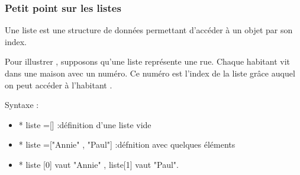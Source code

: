 \begin{frame}
  \frametitle{Petit point sur les listes}
  Une liste est une structure de données permettant d'accéder
à un objet par son index.


Pour illustrer , supposons qu'une liste représente une rue.
Chaque habitant vit dans une maison avec un numéro.
Ce numéro est l'index de la liste grâce auquel on peut accéder
à l'habitant .


Syntaxe :
\begin{itemize}
\item* liste =[] :définition d'une liste vide
\item* liste =["Annie" , "Paul"] :défnition avec quelques éléments
\item* liste [0] vaut "Annie" , liste[1] vaut "Paul".
\end{itemize}



\end{frame}
\begin{frame}
  
\end{frame}
\begin{frame}
  
\end{frame}\begin{frame}
  
\end{frame}






